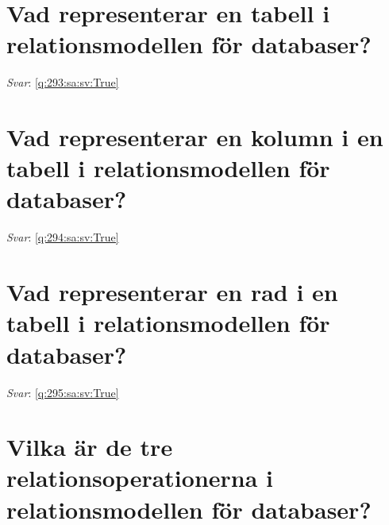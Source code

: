 \documentclass[a4paper,11pt,oneside]{book}
\begin{document}
\begin{sloppypar}
\section{Vad representerar en tabell i relationsmodellen f\"or databaser?}

\label{q:293:sa:sv:False}

\vspace{2cm}

\noindent\makebox[\textwidth]{\hrulefill}

\vspace{1cm}

\textit{Svar}: \autoref{q:293:sa:sv:True}



\section{Vad representerar en kolumn i en tabell i relationsmodellen f\"or databaser?}

\label{q:294:sa:sv:False}

\vspace{2cm}

\noindent\makebox[\textwidth]{\hrulefill}

\vspace{1cm}

\textit{Svar}: \autoref{q:294:sa:sv:True}



\section{Vad representerar en rad i en tabell i relationsmodellen f\"or databaser?}

\label{q:295:sa:sv:False}

\vspace{2cm}

\noindent\makebox[\textwidth]{\hrulefill}

\vspace{1cm}

\textit{Svar}: \autoref{q:295:sa:sv:True}



\section{Vilka \"ar de tre relationsoperationerna i relationsmodellen f\"or databaser?}

\label{q:296:sa:sv:False}

\vspace{2cm}


\end{sloppypar}
\end{document}
